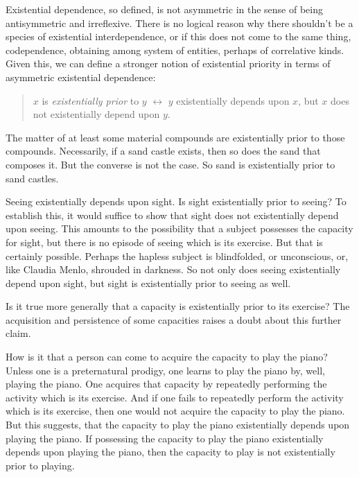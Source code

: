 \documentclass[12pt]{article}
\begin{document}
Existential dependence, so defined, is not asymmetric in the sense of being antisymmetric and irreflexive. There is no logical reason why there shouldn't be a species of existential interdependence, or if this does not come to the same thing, codependence, obtaining among system of entities, perhaps of correlative kinds. Given this, we can define a stronger notion of existential priority in terms of asymmetric existential dependence:
\begin{quote}
    \( x \) is \emph{existentially prior} to \( y \) \( \leftrightarrow \) \( y \) existentially depends upon \( x \), but \( x \) does not existentially depend upon \( y \).
\end{quote}
The matter of at least some material compounds are existentially prior to those compounds. Necessarily, if a sand castle exists, then so does the sand that composes it. But the converse is not the case. So sand is existentially prior to sand castles.

Seeing existentially depends upon sight. Is sight existentially prior to seeing? To establish this, it would suffice to show that sight does not existentially depend upon seeing. This amounts to the possibility that a subject possesses the capacity for sight, but there is no episode of seeing which is its exercise. But that is certainly possible. Perhaps the hapless subject is blindfolded, or unconscious, or, like Claudia Menlo, shrouded in darkness. So not only does seeing existentially depend upon sight, but sight is existentially prior to seeing as well.

Is it true more generally that a capacity is existentially prior to its exercise? The acquisition and persistence of some capacities raises a doubt about this further claim.

How is it that a person can come to acquire the capacity to play the piano? Unless one is a preternatural prodigy, one learns to play the piano by, well, playing the piano. One acquires that capacity by repeatedly performing the activity which is its exercise. And if one fails to repeatedly perform the activity which is its exercise, then one would not acquire the capacity to play the piano. But this suggests, that the capacity to play the piano existentially depends upon playing the piano. If possessing the capacity to play the piano existentially depends upon playing the piano, then the capacity to play is not existentially prior to playing. 
\end{document}
